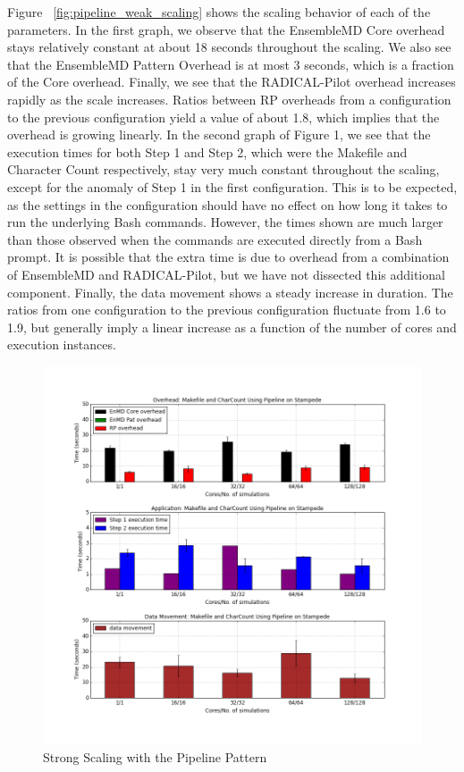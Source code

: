 \documentclass[]{article}
\begin{document}
		Figure ~\ref{fig:pipeline_weak_scaling} shows the scaling behavior of each of the parameters. In the first graph, we observe that the EnsembleMD Core overhead stays relatively constant at about 18 seconds throughout the scaling. We also see that the EnsembleMD Pattern Overhead is at most 3 seconds, which is a fraction of the Core overhead. Finally, we see that the RADICAL-Pilot overhead increases rapidly as the scale increases. Ratios between RP overheads from a configuration to the previous configuration yield a value of about 1.8, which implies that the overhead is growing linearly.
		In the second graph of Figure 1, we see that the execution times for both Step 1 and Step 2, which were the Makefile and Character Count respectively, stay very much constant throughout the scaling, except for the anomaly of Step 1 in the first configuration. This is to be expected, as the settings in the configuration should have no effect on how long it takes to run the underlying Bash commands. However, the times shown are much larger than those observed when the commands are executed directly from a Bash prompt. It is possible that the extra time is due to overhead from a combination of EnsembleMD and RADICAL-Pilot, but we have not dissected this additional component.
		Finally, the data movement shows a steady increase in duration. The ratios from one configuration to the previous configuration fluctuate from 1.6 to 1.9, but generally imply a linear increase as a function of the number of cores and execution instances. 


		\begin{figure}[H]
			\centering
			\includegraphics[scale=.30]{img/pipeline_strong_scaling.png}
			\caption{Strong Scaling with the Pipeline Pattern}
			\label{fig:pipeline_strong_scaling}
		\end{figure}
\end{document}
